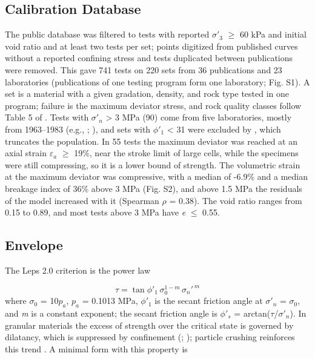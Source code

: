 \documentclass[Journal,letterpaper]{ascelike-new}
\begin{document}
\subsection{Calibration Database}
The public database \cite{arrieta2025} was filtered to tests with reported $\sigma'_3$ $\ge$ 60 kPa and initial void ratio and at least two tests per set; points digitized from published curves without a reported confining stress and tests duplicated between publications were removed. This gave 741 tests on 220 sets from 36 publications and 23 laboratories (publications of one testing program form one laboratory; Fig. S1). A set is a material with a given gradation, density, and rock type tested in one program; failure is the maximum deviator stress, and rock quality classes follow Table 5 of . Tests with $\sigma'_n$ > 3 MPa (90) come from five laboratories, mostly from 1963--1983 (e.g., ; ), and sets with $\phi'_1$ < 31\textdegree{} were excluded by , which truncates the population. In 55 tests the maximum deviator was reached at an axial strain $\varepsilon_a$ $\ge$ 19\%, near the stroke limit of large cells, while the specimens were still compressing, so it is a lower bound of strength. The volumetric strain at the maximum deviator was compressive, with a median of -6.9\% and a median breakage index of 36\% above 3 MPa (Fig. S2), and above 1.5 MPa the residuals of the model increased with it (Spearman $\rho$ = 0.38). The void ratio ranges from 0.15 to 0.89, and most tests above 3 MPa have \textit{e} $\le$ 0.55.

\subsection{Envelope}
The Leps 2.0 criterion is the power law

\begin{equation}
\tau=\tan\phi'_1\,\sigma_0^{1-m}\,\sigma_n'^{\,m}
\end{equation}
\noindent where $\sigma_0$ = 10$p_a$, $p_a$ = 0.1013 MPa, $\phi'_1$ is the secant friction angle at $\sigma'_n$ = $\sigma_0$, and \textit{m} is a constant exponent; the secant friction angle is $\phi'_s$ = arctan($\tau$/$\sigma'_n$). In granular materials the excess of strength over the critical state is governed by dilatancy, which is suppressed by confinement (; ); particle crushing reinforces this trend \cite{hardin1985,einav2007}. A minimal form with this property is
\end{document}
